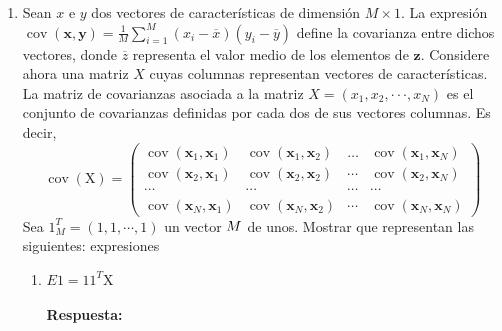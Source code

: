 \documentclass[12pt,a4paper]{article}
\begin{document}
\begin{enumerate}
	\item Sean $x$ e $y$ dos vectores de características de dimensión $M \times 1$. La expresión $\operatorname{cov}(\mathbf{x}, \mathbf{y})=\frac{1}{M} \sum_{i=1}^{M}\left(x_{i}-\overline{x}\right)\left(y_{i}-\overline{y}\right)$ define la covarianza entre dichos vectores, donde $\overline{z}$ representa el valor medio de los elementos de $\textbf{z}$. Considere ahora una matriz $X$ cuyas columnas representan vectores de características. La matriz de covarianzas asociada a la matriz $X = (x_1 , x_2 , · · · , x_N )$ es el conjunto de covarianzas definidas por cada dos de sus vectores columnas. Es decir, $$\operatorname{cov}(\mathrm{X})=\left( \begin{array}{cccc}{\operatorname{cov}\left(\mathbf{x}_{1}, \mathbf{x}_{1}\right)} & {\operatorname{cov}\left(\mathbf{x}_{1}, \mathbf{x}_{2}\right)} & {\dots} & {\operatorname{cov}\left(\mathbf{x}_{1}, \mathbf{x}_{N}\right)} \\ {\operatorname{cov}\left(\mathbf{x}_{2}, \mathbf{x}_{1}\right)} & {\operatorname{cov}\left(\mathbf{x}_{2}, \mathbf{x}_{2}\right)} & {\cdots} & {\operatorname{cov}\left(\mathbf{x}_{2}, \mathbf{x}_{N}\right)} \\ {\cdots} & {\cdots} & {\cdots} & {\cdots} \\ {\operatorname{cov}\left(\mathbf{x}_{N}, \mathbf{x}_{1}\right)} & {\operatorname{cov}\left(\mathbf{x}_{N}, \mathbf{x}_{2}\right)} & {\cdots} & {\operatorname{cov}\left(\mathbf{x}_{N}, \mathbf{x}_{N}\right)}\end{array}\right)$$ Sea $1_{M}^{T}=(1,1, \cdots, 1)$ un vector $M \time 1$ de unos. Mostrar que representan las siguientes:
	expresiones
	\begin{enumerate}
		\item  $E 1=11^{T} \mathrm{X}$\\\\
		\textbf{Respuesta:}\\


\end{enumerate}
\end{enumerate}
\end{document}
